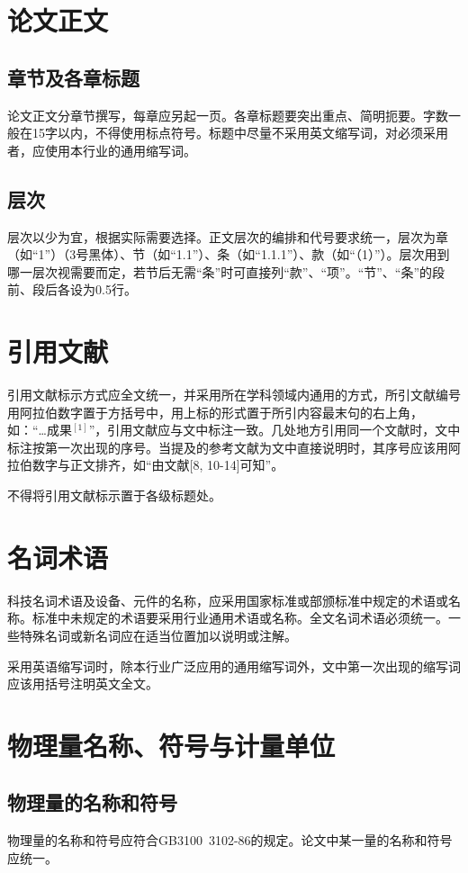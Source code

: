 \section{论文正文}
\subsection{章节及各章标题}
论文正文分章节撰写，每章应另起一页。各章标题要突出重点、简明扼要。字数一般在15字以内，不得使用标点符号。标题中尽量不采用英文缩写词，对必须采用者，应使用本行业的通用缩写词。

\subsection{层次}
层次以少为宜，根据实际需要选择。正文层次的编排和代号要求统一，层次为章（如“1”）（3号黑体）、节（如“1.1”）、条（如“1.1.1”）、款（如“（1）”）。层次用到哪一层次视需要而定，若节后无需“条”时可直接列“款”、“项”。“节”、“条”的段前、段后各设为0.5行。

\section{引用文献}
引用文献标示方式应全文统一，并采用所在学科领域内通用的方式，所引文献编号用阿拉伯数字置于方括号中，用上标的形式置于所引内容最末句的右上角，如：“…成果$^{[1]}$”，引用文献应与文中标注一致。几处地方引用同一个文献时，文中标注按第一次出现的序号。当提及的参考文献为文中直接说明时，其序号应该用阿拉伯数字与正文排齐，如“由文献[8, 10-14]可知”。

不得将引用文献标示置于各级标题处。

\section{名词术语}
科技名词术语及设备、元件的名称，应采用国家标准或部颁标准中规定的术语或名称。标准中未规定的术语要采用行业通用术语或名称。全文名词术语必须统一。一些特殊名词或新名词应在适当位置加以说明或注解。

采用英语缩写词时，除本行业广泛应用的通用缩写词外，文中第一次出现的缩写词应该用括号注明英文全文。

\section{物理量名称、符号与计量单位}
\subsection{物理量的名称和符号}
物理量的名称和符号应符合GB3100~3102-86的规定。论文中某一量的名称和符号应统一。

